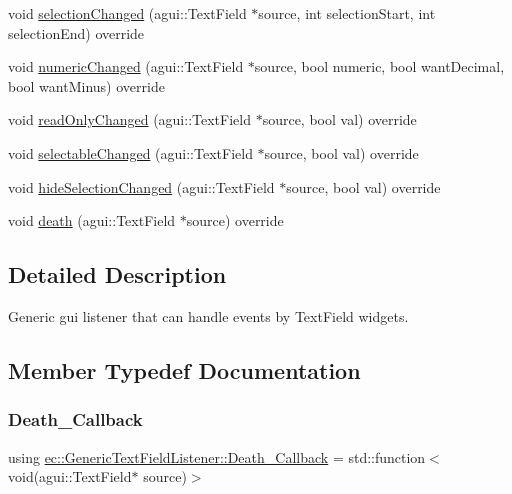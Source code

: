 \begin{DoxyCompactItemize}
void \mbox{\hyperlink{classec_1_1_generic_text_field_listener_a4f367bd9dc4080c21c99ca3862a37d9c}{selection\+Changed}} (agui\+::\+Text\+Field $\ast$source, int selection\+Start, int selection\+End) override
\item 
void \mbox{\hyperlink{classec_1_1_generic_text_field_listener_ab65f5b7d2527c5785c1ec5db708f19a2}{numeric\+Changed}} (agui\+::\+Text\+Field $\ast$source, bool numeric, bool want\+Decimal, bool want\+Minus) override
\item 
void \mbox{\hyperlink{classec_1_1_generic_text_field_listener_a3fd8ac7b4e08a382b74493a324d7e489}{read\+Only\+Changed}} (agui\+::\+Text\+Field $\ast$source, bool val) override
\item 
void \mbox{\hyperlink{classec_1_1_generic_text_field_listener_aa4c1f23d93458a196eac20b3870e1cf1}{selectable\+Changed}} (agui\+::\+Text\+Field $\ast$source, bool val) override
\item 
void \mbox{\hyperlink{classec_1_1_generic_text_field_listener_a53ee00fec8f9d4a56394521c2773cb5d}{hide\+Selection\+Changed}} (agui\+::\+Text\+Field $\ast$source, bool val) override
\item 
void \mbox{\hyperlink{classec_1_1_generic_text_field_listener_a3c4b1eb19fc23c30da3bc1786aea9a34}{death}} (agui\+::\+Text\+Field $\ast$source) override
\end{DoxyCompactItemize}


\subsection{Detailed Description}
Generic gui listener that can handle events by Text\+Field widgets. 

\subsection{Member Typedef Documentation}
\mbox{\label{classec_1_1_generic_text_field_listener_a720d56c97f2ac11e2658db516b186d4f}} 
\subsubsection{\texorpdfstring{Death\+\_\+\+Callback}{Death\_Callback}}
{\footnotesize\ttfamily using \mbox{\hyperlink{classec_1_1_generic_text_field_listener_a720d56c97f2ac11e2658db516b186d4f}{ec\+::\+Generic\+Text\+Field\+Listener\+::\+Death\+\_\+\+Callback}} =  std\+::function$<$void(agui\+::\+Text\+Field$\ast$ source)$>$}

